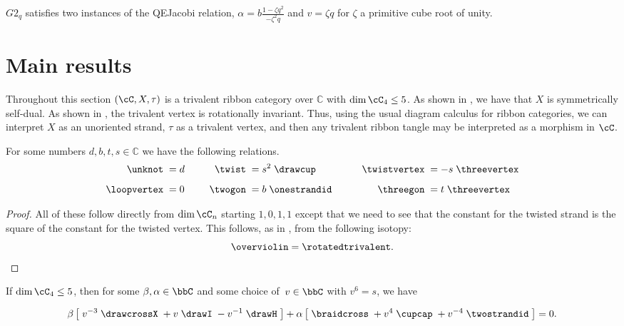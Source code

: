\documentclass[12pt]{amsart}
\begin{document}
\begin{lemma}
$G2_q$ satisfies two instances of the QEJacobi relation, $\alpha = b \frac{1-\zeta q^2}{-\zeta^2 q}$ and $v = \zeta q$ for $\zeta$ a primitive cube root of unity.
\end{lemma}



\section{Main results}

Throughout this section $(\cC, X, \tau)$ is a trivalent ribbon category over
$\mathbb{C}$ with $\dim{\cC_4} \leq 5$.  As shown in \cite[Lemma
2.2]{MR3624901}, we have that $X$ is symmetrically self-dual.  As shown in
\cite[Lemma 8.2]{MR3624901}, the trivalent vertex is rotationally invariant.
Thus, using the usual diagram calculus for ribbon categories, we can interpret
$X$ as an unoriented strand, $\tau$ as a trivalent vertex, and then any
trivalent ribbon tangle may be interpreted as a morphism in $\cC$.

\begin{lemma} \label{lem:constants}
  For some numbers $d, b, t, s \in \mathbb{C}$ we have the following relations.
  \begin{equation}
    \label{eq:simple-rels}
  \begin{aligned}
    \unknot\; &= d&\qquad
      \twist\; &= s^2\;\drawcup&\qquad
        \twistvertex\; &= -s\;\threevertex\\[5pt]
    \loopvertex\;&=0&
      \twogon\;&= b\;\onestrandid&
        \threegon\; &= t\;\threevertex
  \end{aligned}
  \end{equation}
\end{lemma}

\begin{proof}
All of these follow directly from $\dim \cC_n$ starting $1,0,1,1$ except that
we need to see that the constant for the twisted strand is the square of the
constant for the twisted vertex.  This follows, as in
\cite[Lemma~8.2]{MR3624901}, from the following isotopy:
\begin{equation*}
\overviolin = \rotatedtrivalent. \qedhere
\end{equation*}
\end{proof}

\begin{proposition}\label{prop:Jacobi}
If $\dim \cC_4 \leq 5$, then for some $\beta, \alpha \in \bbC$ and some choice
of~$v \in \bbC$ with $v^6 = s$, we have

\begin{equation}
\beta \left[\; v^{-3} \;
\drawcrossX
\;+ v \;
\drawI
\; -v^{-1} \;
 \drawH
\;\right]
 + \alpha
\left[\; \braidcross \;
 + v^{4}\;
\cupcap
\; + v^{-4} \;
 \twostrandid \;
 \right] = 0.\label{eq:quant-except-init}
 \end{equation}
\end{proposition}
\end{document}
